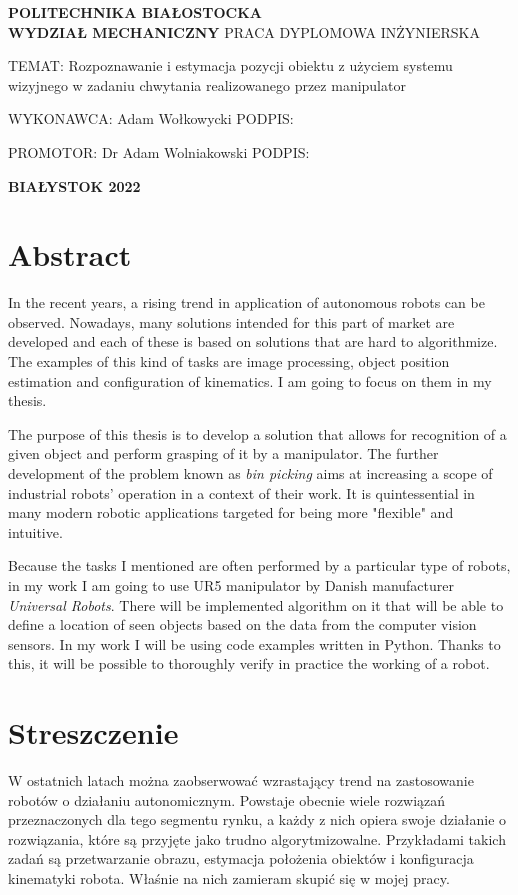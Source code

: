 \documentclass{article}
\newcommand\filling[1][4cm]{\makebox[#1]{\dotfill}}
\begin{document}
\begin{center}
\huge{\textbf{POLITECHNIKA BIAŁOSTOCKA}} \\
\LARGE{\textbf{WYDZIAŁ MECHANICZNY}} 
\vfill
\huge{PRACA DYPLOMOWA INŻYNIERSKA}
\vfill
\end{center}

\LARGE{TEMAT: Rozpoznawanie i estymacja pozycji obiektu z użyciem systemu wizyjnego w zadaniu chwytania realizowanego przez manipulator}
\vfill
\begin{flushright}
\LARGE{WYKONAWCA: Adam Wołkowycki}
\vfill
\LARGE{PODPIS: \filling[4cm]}
\vfill
\end{flushright}
\LARGE{PROMOTOR: Dr Adam Wolniakowski}
\vfill
\LARGE{PODPIS: \filling[4cm]}
\vfill
\Large{}

\begin{center}
\Large{\textbf{BIAŁYSTOK 2022}}
\end{center}
\thispagestyle{empty}

\newpage
\section*{\LARGE{Abstract}}
In the recent years, a rising trend in application of autonomous robots can be observed. Nowadays, many solutions intended for this part of market are developed and each of these is based on solutions that are hard to algorithmize. The examples of this kind of tasks are image processing, object position estimation and configuration of kinematics. I am going to focus on them in my thesis.

The purpose of this thesis is to develop a solution that allows for recognition of a given object and perform grasping of it by a manipulator. The further development of the problem known as \emph{bin picking} aims at increasing a scope of industrial robots' operation in a context of their work. It is quintessential in many modern robotic applications targeted for being more "flexible" and intuitive.

Because the tasks I mentioned are often performed by a particular type of robots, in my work I am going to use UR5 manipulator by Danish manufacturer \emph{Universal Robots}. There will be implemented algorithm on it that will be able to define a location of seen objects based on the data from the computer vision sensors. In my work I will be using code examples written in Python. Thanks to this, it will be possible to thoroughly verify in practice the working of a robot.

\newpage
\section*{\LARGE{Streszczenie}}
W ostatnich latach można zaobserwować wzrastający trend na zastosowanie robotów o działaniu autonomicznym. Powstaje obecnie wiele rozwiązań przeznaczonych dla tego segmentu rynku, a każdy z nich opiera swoje działanie o rozwiązania, które są przyjęte jako trudno algorytmizowalne. Przykładami takich zadań są przetwarzanie obrazu, estymacja położenia obiektów i konfiguracja kinematyki robota. Właśnie na nich zamieram skupić się w mojej pracy.
\end{document}
